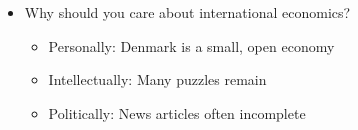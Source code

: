 \documentclass[ignorenonframetext,]{beamer}
\begin{document}
\begin{frame}

\begin{itemize}
\itemsep1pt\parskip0pt
\item
  Why should you care about international economics?

  \begin{itemize}
  \itemsep1pt\parskip0pt
  \item
    Personally: Denmark is a small, open economy
  \item
    Intellectually: Many puzzles remain
  \item
    Politically: News articles often incomplete
  \end{itemize}
\end{itemize}

\end{frame}

\begin{frame}

\end{frame}
\end{document}
